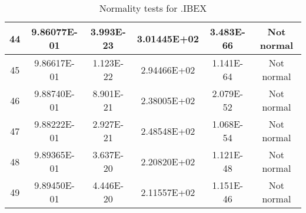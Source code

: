 \begin{table}[h]
\begin{tabular}{|c|c|c|c|c|c|}
		44 & 9.86077E-01 & 3.993E-23 & 3.01445E+02 & 3.483E-66 & Not normal\\\hline
		45 & 9.86617E-01 & 1.123E-22 & 2.94466E+02 & 1.141E-64 & Not normal\\\hline
		46 & 9.88740E-01 & 8.901E-21 & 2.38005E+02 & 2.079E-52 & Not normal\\\hline
		47 & 9.88222E-01 & 2.927E-21 & 2.48548E+02 & 1.068E-54 & Not normal\\\hline
		48 & 9.89365E-01 & 3.637E-20 & 2.20820E+02 & 1.121E-48 & Not normal\\\hline
		49 & 9.89450E-01 & 4.446E-20 & 2.11557E+02 & 1.151E-46 & Not normal\\\hline
	\end{tabular}
	\caption{Normality tests for .IBEX}
\end{table}
